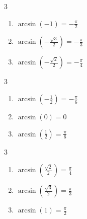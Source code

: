 \documentclass{ximera}
\begin{document}
	\author{Stitz-Zeager}


 \begin{multicols}{3} 

\begin{enumerate}

\item $\arcsin \left( -1 \right) = -\frac{\pi}{2}$ 
\item $\arcsin \left( -\frac{\sqrt{3}}{2} \right) = -\frac{\pi}{3}$
\item $\arcsin \left( -\frac{\sqrt{2}}{2} \right) = -\frac{\pi}{4}$

\setcounter{HW}{\value{enumi}}

\end{enumerate}

\end{multicols}

\begin{multicols}{3} 

\begin{enumerate}

\setcounter{enumi}{\value{HW}}

\item $\arcsin \left( -\frac{1}{2} \right) = -\frac{\pi}{6}$
\item $\arcsin \left( 0 \right) = 0$ 
\item $\arcsin \left( \frac{1}{2} \right) = \frac{\pi}{6}$

\setcounter{HW}{\value{enumi}}

\end{enumerate}

\end{multicols}

\begin{multicols}{3} 

\begin{enumerate}

\setcounter{enumi}{\value{HW}}

\item $\arcsin \left( \frac{\sqrt{2}}{2} \right) = \frac{\pi}{4}$
\item $\arcsin \left( \frac{\sqrt{3}}{2} \right) = \frac{\pi}{3}$
\item $\arcsin \left( 1 \right) = \frac{\pi}{2}$ 

\setcounter{HW}{\value{enumi}}

\end{enumerate}

\end{multicols}
\end{document}

